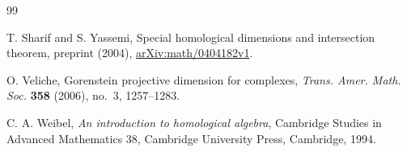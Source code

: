 \documentclass[10pt, a4paper,reqno]{amsart}
\theoremstyle{definition}
\theoremstyle{remark}
\numberwithin{equation}{thm}
\begin{document}
\begin{thebibliography}{99}

{\sc T. Sharif and S. Yassemi},
Special homological dimensions and intersection theorem,
preprint (2004), \href{https://arxiv.org/abs/math/0404182}{arXiv:math/0404182v1}.

{\sc O. Veliche},
Gorenstein projective dimension for complexes,
{\em Trans. Amer. Math. Soc.} \textbf{358} (2006), no.~3, 1257--1283.

{\sc C. A. Weibel},
{\em An introduction to homological algebra},
Cambridge Studies in Advanced Mathematics 38, Cambridge University Press, Cambridge, 1994.

\end{thebibliography}
\end{document}
